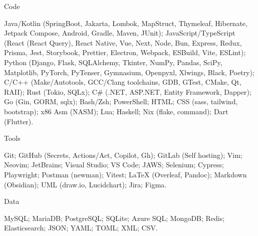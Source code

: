 \documentclass[10pt, a4paper]{russell}
\begin{document}
\makecvheader
\makecvfooter{\today}{}{\thepage}

\begin{cvskills}

    \cvskill
        {Code}
        {\parbox[t]{0.99\linewidth}{
            Java/Kotlin (SpringBoot, Jakarta, Lombok, MapStruct, Thymeleaf, Hibernate, Jetpack Compose, Android, Gradle, Maven, JUnit); 
            JavaScript/TypeScript (React (React Query), React Native, Vue, Next, Node, Bun, Express, Redux, Prisma, Jest, Storybook, Prettier, Electron, Webpack, ESBuild, Vite, ESLint); 
            Python (Django, Flask, SQLAlchemy, Tkinter, NumPy, Pandas, SciPy, Matplotlib, PyTorch, PyTenser, Gymnasium, Openpyxl, Xlwings, Black, Poetry);
            C/C++ (Make/Autotools, GCC/Clang toolchains, GDB, GTest, CMake, Qt, RAII);
            Rust (Tokio, SQLx);
            C\# (.NET, ASP.NET, Entity Framework, Dapper); 
            Go (Gin, GORM, sqlx);
            Bash/Zsh;
            PowerShell;
            HTML;
            CSS (sass, tailwind, bootstrap);
            x86 Asm (NASM);
            Lua;
            Haskell;
            Nix (flake, command);
            Dart (Flutter).
        }}

    \cvskill
        {Tools}
        {\parbox[t]{0.99\linewidth}{
            Git;  
            GitHub (Secrets, Actions/Act, Copilot, Gh);  
            GitLab (Self hosting);
            Vim;  
            Neovim;  
            JetBrains;  
            Visual Studio;  
            VS Code;  
            JAWS;  
            Selenium;  
            Cypress;  
            Playwright;  
            Postman (newman);  
            Vitest;    
            LaTeX (Overleaf, Pandoc);  
            Markdown (Obsidian);  
            UML (draw.io, Lucidchart);  
            Jira;  
            Figma.
        }}

    \cvskill
        {Data}
        {\parbox[t]{0.99\linewidth}{
            MySQL;
            MariaDB;  
            PostgreSQL;  
            SQLite;  
            Azure SQL;
            MongoDB;  
            Redis;
            Elasticsearch;
            JSON;  
            YAML;  
            TOML;  
            XML;  
            CSV.
        }}


\end{cvskills}
\end{document}
